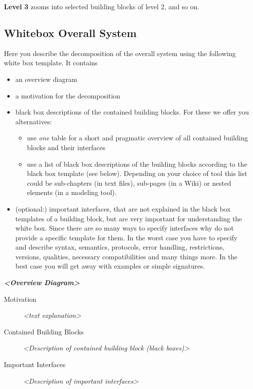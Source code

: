 \documentclass[]{article}
\begin{document}
\textbf{Level 3} zooms into selected building blocks of level 2, and so
on.

\hypertarget{_whitebox_overall_system}{%
\subsection{Whitebox Overall System}\label{_whitebox_overall_system}}

Here you describe the decomposition of the overall system using the
following white box template. It contains

\begin{itemize}
\item
  an overview diagram
\item
  a motivation for the decomposition
\item
  black box descriptions of the contained building blocks. For these we
  offer you alternatives:

  \begin{itemize}
  \item
    use \emph{one} table for a short and pragmatic overview of all
    contained building blocks and their interfaces
  \item
    use a list of black box descriptions of the building blocks
    according to the black box template (see below). Depending on your
    choice of tool this list could be sub-chapters (in text files),
    sub-pages (in a Wiki) or nested elements (in a modeling tool).
  \end{itemize}
\item
  (optional:) important interfaces, that are not explained in the black
  box templates of a building block, but are very important for
  understanding the white box. Since there are so many ways to specify
  interfaces why do not provide a specific template for them. In the
  worst case you have to specify and describe syntax, semantics,
  protocols, error handling, restrictions, versions, qualities,
  necessary compatibilities and many things more. In the best case you
  will get away with examples or simple signatures.
\end{itemize}

\emph{\textbf{\textless{}Overview Diagram\textgreater{}}}

\begin{description}
\item[Motivation]
\emph{\textless{}text explanation\textgreater{}}
\item[Contained Building Blocks]
\emph{\textless{}Description of contained building block (black
boxes)\textgreater{}}
\item[Important Interfaces]
\emph{\textless{}Description of important interfaces\textgreater{}}
\end{description}
\end{document}
